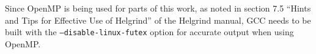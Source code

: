 Since OpenMP is being used for parts of this work, as noted in section 7.5 ``Hints and Tips for Effective Use of Helgrind'' of the Helgrind manual\cite{hgmanual}, GCC needs to be built with the \texttt{--disable-linux-futex} option for accurate output when using OpenMP.

